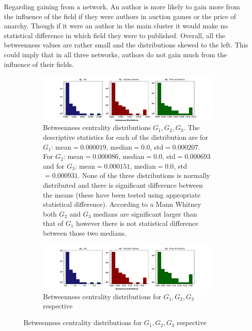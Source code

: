 \documentclass{article}
\theoremstyle{definition}
\begin{document}
Regarding gaining from a network. An author is more likely to gain more
from the influence of the field if they were authors in auction games or the
price of anarchy. Though if it were an author in the main cluster it would make
no statistical difference in which field they were to published. Overall,
all the betweenness values are rather small and the distributions skewed to the
left. This could imply that in all three networks, authors do not gain much from
the influence of their fields.

\begin{figure}[!hbtp]
    \centering
    \begin{subfigure}{\textwidth}\centering
        \includegraphics[width=\textwidth]{./assets/images/betweeness_distributions.pdf}
        \caption{Betweenness centrality distributions \(G_1, G_2, G_3\). The descriptive
        statistics for each of the distribution are for \(G_1\): mean\(=0.000019\),
        median\(=0.0\), std\(=0.000207\). For \(G_2\): mean\(=0.000086\), median\(=0.0\),
        std\(=0.000693\) and for \(G_3\): mean\(=0.000151\), median\(=0.0\), std\(=0.000931\).
        None of the three distributions is normally distributed and there is
        significant difference between the means (these have been tested using
        appropriate statistical difference). According to a Mann Whitney both
        \(G_2\) and \(G_3\) medians are significant larger than that of \(G_1\) however there
        is not statistical difference between those two medians.}\label{fig:betweenness_dist}
    \end{subfigure}
    \begin{subfigure}{\textwidth}\centering
        \includegraphics[width=\textwidth]{./assets/images/betweeness_distributions_clusters.pdf}
        \caption{Betweenness centrality distributions for \(G_1, G_2, G_3\) respective
}
\end{subfigure}
\end{figure}
\end{document}
